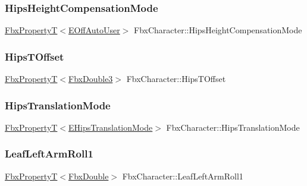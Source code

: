 \subsubsection{\texorpdfstring{Hips\+Height\+Compensation\+Mode}{HipsHeightCompensationMode}}
{\footnotesize\ttfamily \hyperlink{class_fbx_property_t}{Fbx\+PropertyT}$<$\hyperlink{class_fbx_character_ab698a180e6f900ba8317257749c2ecce}{E\+Off\+Auto\+User}$>$ Fbx\+Character\+::\+Hips\+Height\+Compensation\+Mode}

\mbox{\label{class_fbx_character_af57834880f8f20bbb4c6eb241413be98}} 
\subsubsection{\texorpdfstring{Hips\+T\+Offset}{HipsTOffset}}
{\footnotesize\ttfamily \hyperlink{class_fbx_property_t}{Fbx\+PropertyT}$<$\hyperlink{fbxtypes_8h_ae0a96f14cde566774c7553aa7523b7a7}{Fbx\+Double3}$>$ Fbx\+Character\+::\+Hips\+T\+Offset}

\mbox{\label{class_fbx_character_aa1b3da64538ec9daaf50daab0bf77b1f}} 
\subsubsection{\texorpdfstring{Hips\+Translation\+Mode}{HipsTranslationMode}}
{\footnotesize\ttfamily \hyperlink{class_fbx_property_t}{Fbx\+PropertyT}$<$\hyperlink{class_fbx_character_a908e56db46ed8467b779dbf39ec30952}{E\+Hips\+Translation\+Mode}$>$ Fbx\+Character\+::\+Hips\+Translation\+Mode}

\mbox{\label{class_fbx_character_a06d07e0ace0fd744c0df69d43e49dc57}} 
\subsubsection{\texorpdfstring{Leaf\+Left\+Arm\+Roll1}{LeafLeftArmRoll1}}
{\footnotesize\ttfamily \hyperlink{class_fbx_property_t}{Fbx\+PropertyT}$<$\hyperlink{fbxtypes_8h_a171e72a1c46fc15c1a6c9c31948c1c5b}{Fbx\+Double}$>$ Fbx\+Character\+::\+Leaf\+Left\+Arm\+Roll1}

